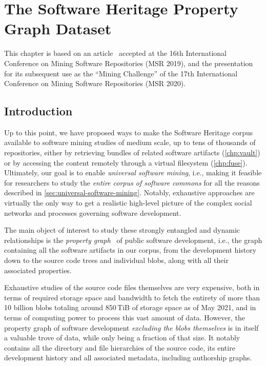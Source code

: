 \chapter{The Software Heritage Property Graph Dataset}%
\label{chp:graph-dataset}

This chapter is based on an article~\cite{swh-msr2019-dataset} accepted at the
16th International Conference on Mining Software Repositories (MSR 2019), and
the presentation~\cite{msr-2020-challenge} for its subsequent use as the
``Mining Challenge'' of the 17th International Conference on Mining Software
Repositories (MSR 2020).

\section{Introduction}

Up to this point, we have proposed ways to make the Software Heritage corpus
available to software mining studies of medium scale, up to tens of thousands
of repositories, either by retrieving bundles of related software artifacts
(\cref{chp:vault}) or by accessing the content remotely through a
virtual filesystem (\cref{chp:fuse}). Ultimately, our goal is to enable
\emph{universal software mining}, i.e., making it feasible for researchers to
study the \emph{entire corpus of software commons} for all the reasons
described in \cref{sec:universal-software-mining}. Notably, exhaustive
approaches are virtually the only way to get a realistic high-level picture of
the complex social networks and processes governing software development.

The main object of interest to study these strongly entangled and dynamic
relationships is the \emph{property
graph}~\cite{angles2018propertygraph,bonifati2018graphquery} of public software
development, i.e., the graph containing all the software artifacts in our
corpus, from the development history down to the source code trees and
individual blobs, along with all their associated properties.

Exhaustive studies of the source code files themselves are very expensive, both
in terms of required storage space and bandwidth to fetch the entirety of more
than 10 billion blobs totaling around 850\,TiB of storage space as of May
2021, and in terms of computing power to process this vast amount of data.
However, the property graph of software development \emph{excluding the blobs
themselves} is in itself a valuable trove of data, while only being a fraction
of that size.  It notably contains all the directory and file hierarchies of
the source code, its entire development history and all associated metadata,
including authorship graphs.

